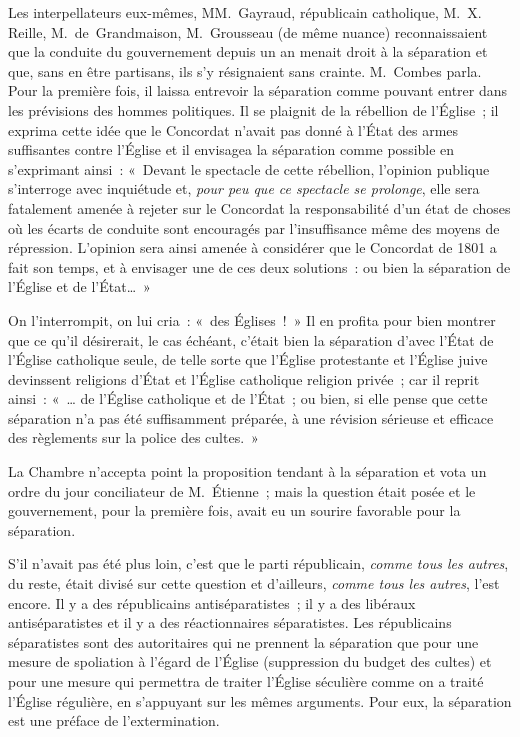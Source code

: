 \documentclass[french,twoside]{book} %
\begin{document}
Les interpellateurs eux-mêmes, MM. Gayraud, républicain catholique, M. X. Reille, M. de Grandmaison, M. Grousseau (de même nuance) reconnaissaient que la conduite du gouvernement depuis un an menait droit à la séparation et que, sans en être partisans, ils s’y résignaient sans crainte. M. Combes parla. Pour la première fois, il laissa entrevoir la séparation comme pouvant entrer dans les prévisions des hommes politiques. Il se plaignit de la rébellion de l’Église ; il exprima cette idée que le Concordat n’avait pas donné à l’État des armes suffisantes contre l’Église et il envisagea la séparation comme possible en s’exprimant ainsi : « Devant le spectacle de cette rébellion, l’opinion publique s’interroge avec inquiétude et, {\itshape pour peu que ce spectacle se prolonge}, elle sera fatalement amenée à rejeter sur le Concordat la responsabilité d’un état de choses où les écarts de conduite sont encouragés par l’insuffisance même des moyens de répression. L’opinion sera ainsi amenée à considérer que le Concordat de 1801 a fait son temps, et à envisager une de ces deux solutions :  ou bien la séparation de l’Église et de l’État… »\par
On l’interrompit, on lui cria : « des Églises ! » Il en profita pour bien montrer que ce qu’il désirerait, le cas échéant, c’était bien la séparation d’avec l’État de l’Église catholique seule, de telle sorte que l’Église protestante et l’Église juive devinssent religions d’État et l’Église catholique religion privée ; car il reprit ainsi : « … de l’Église catholique et de l’État ; ou bien, si elle pense que cette séparation n’a pas été suffisamment préparée, à une révision sérieuse et efficace des règlements sur la police des cultes. »\par
La Chambre n’accepta point la proposition tendant à la séparation et vota un ordre du jour conciliateur de M. Étienne ; mais la question était posée et le gouvernement, pour la première fois, avait eu un sourire favorable pour la séparation.\par
S’il n’avait pas été plus loin, c’est que le parti républicain, {\itshape comme tous les autres}, du reste, était divisé sur cette question et d’ailleurs, {\itshape comme tous les autres}, l’est encore. Il y a des républicains antiséparatistes ; il y a des libéraux antiséparatistes et il y a des réactionnaires séparatistes. Les républicains séparatistes sont des autoritaires qui ne prennent la séparation que pour une mesure de spoliation à l’égard de l’Église (suppression du budget des cultes) et pour une mesure qui permettra  de traiter l’Église séculière comme on a traité l’Église régulière, en s’appuyant sur les mêmes arguments. Pour eux, la séparation est une préface de l’extermination.\par
\end{document}
